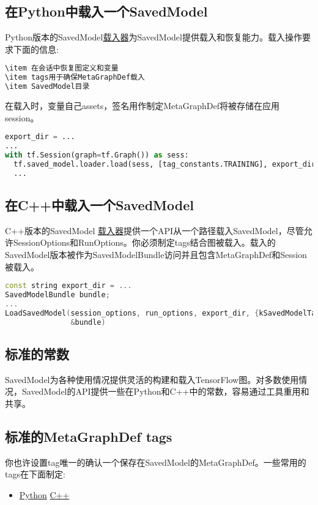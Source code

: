 \subsection{在Python中载入一个SavedModel}
Python版本的SavedModel\href{https://www.tensorflow.org/api_docs/python/tf/saved_model/loader?hl=zh-cn}{载入器}为SavedModel提供载入和恢复能力。载入操作要求下面的信息:
\begin{lstlisting}[language=Python]
\item 在会话中恢复图定义和变量
\item tags用于确保MetaGraphDef载入
\item SavedModel目录
\end{lstlisting}
在载入时，变量自己assets，签名用作制定MetaGraphDef将被存储在应用session。
\begin{lstlisting}[language=Python]
export_dir = ...
...
with tf.Session(graph=tf.Graph()) as sess:
  tf.saved_model.loader.load(sess, [tag_constants.TRAINING], export_dir)
  ...
\end{lstlisting}
\subsection{在C++中载入一个SavedModel}
C++版本的SavedModel \href{https://github.com/tensorflow/tensorflow/blob/master/tensorflow/cc/saved_model/loader.h}{载入器}提供一个API从一个路径载入SavedModel，尽管允许SessionOptions和RunOptions。你必须制定tags结合图被载入。载入的SavedModel版本被作为SavedModelBundle访问并且包含MetaGraphDef和Session被载入。
\begin{lstlisting}[language=C++]
const string export_dir = ...
SavedModelBundle bundle;
...
LoadSavedModel(session_options, run_options, export_dir, {kSavedModelTagTrain},
               &bundle)
\end{lstlisting}
\subsection{标准的常数}
SavedModel为各种使用情况提供灵活的构建和载入TensorFlow图。对多数使用情况，SavedModel的API提供一些在Python和C++中的常数，容易通过工具重用和共享。
\subsection{标准的MetaGraphDef tags}
你也许设置tag唯一的确认一个保存在SavedModel的MetaGraphDef。一些常用的tags在下面制定:
\begin{itemize}
\item \href{https://github.com/tensorflow/tensorflow/blob/master/tensorflow/python/saved_model/tag_constants.py}{Python}
\iten \href{https://github.com/tensorflow/tensorflow/blob/master/tensorflow/cc/saved_model/tag_constants.h}{C++}
\end{itemize}
